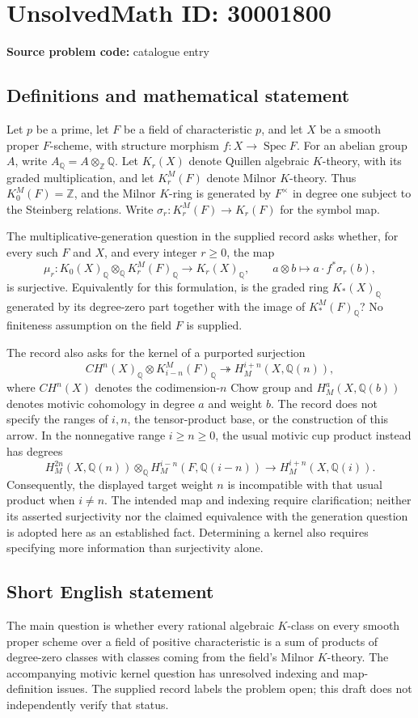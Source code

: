 \documentclass[11pt]{article}
\newcommand{\Z}{\mathbb{Z}}
\newcommand{\Q}{\mathbb{Q}}
\begin{document}
\section*{UnsolvedMath ID: 30001800}
\textbf{Source problem code:} catalogue entry
\subsection{Definitions and mathematical statement}
Let \(p\) be a prime, let \(F\) be a field of characteristic \(p\), and let \(X\) be a smooth proper \(F\)-scheme, with structure morphism \(f\colon X\to\operatorname{Spec}F\). For an abelian group \(A\), write \(A_{\Q}=A\otimes_{\Z}\Q\). Let \(K_r(X)\) denote Quillen algebraic \(K\)-theory, with its graded multiplication, and let \(K_r^M(F)\) denote Milnor \(K\)-theory. Thus \(K_0^M(F)=\Z\), and the Milnor \(K\)-ring is generated by \(F^\times\) in degree one subject to the Steinberg relations. Write \(\sigma_r\colon K_r^M(F)\to K_r(F)\) for the symbol map.

The multiplicative-generation question in the supplied record asks whether, for every such \(F\) and \(X\), and every integer \(r\geq 0\), the map
\[
\mu_r\colon K_0(X)_{\Q}\otimes_{\Q}K_r^M(F)_{\Q}\longrightarrow K_r(X)_{\Q},
\qquad a\otimes b\longmapsto a\cdot f^*\sigma_r(b),
\]
is surjective. Equivalently for this formulation, is the graded ring \(K_*(X)_{\Q}\) generated by its degree-zero part together with the image of \(K_*^M(F)_{\Q}\)? No finiteness assumption on the field \(F\) is supplied.

The record also asks for the kernel of a purported surjection
\[
CH^n(X)_{\Q}\otimes K_{i-n}^M(F)_{\Q}
\twoheadrightarrow H_M^{i+n}(X,\Q(n)),
\]
where \(CH^n(X)\) denotes the codimension-\(n\) Chow group and \(H_M^a(X,\Q(b))\) denotes motivic cohomology in degree \(a\) and weight \(b\). The record does not specify the ranges of \(i,n\), the tensor-product base, or the construction of this arrow. In the nonnegative range \(i\geq n\geq0\), the usual motivic cup product instead has degrees
\[
H_M^{2n}(X,\Q(n))\otimes_{\Q}
H_M^{i-n}(F,\Q(i-n))
\longrightarrow H_M^{i+n}(X,\Q(i)).
\]
Consequently, the displayed target weight \(n\) is incompatible with that usual product when \(i\ne n\). The intended map and indexing require clarification; neither its asserted surjectivity nor the claimed equivalence with the generation question is adopted here as an established fact. Determining a kernel also requires specifying more information than surjectivity alone.
\subsection{Short English statement}
The main question is whether every rational algebraic \(K\)-class on every smooth proper scheme over a field of positive characteristic is a sum of products of degree-zero classes with classes coming from the field's Milnor \(K\)-theory. The accompanying motivic kernel question has unresolved indexing and map-definition issues. The supplied record labels the problem open; this draft does not independently verify that status.
\end{document}
